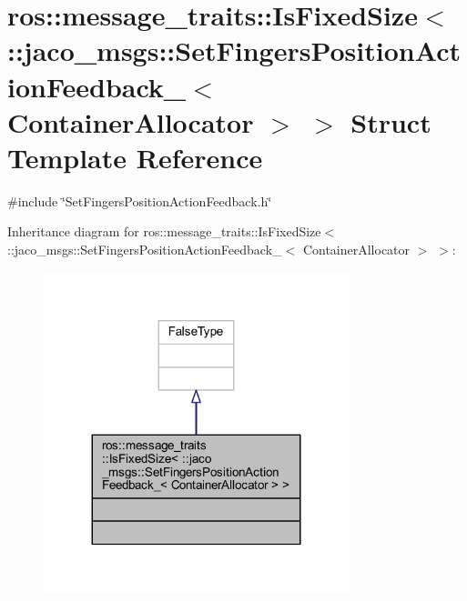 \hypertarget{structros_1_1message__traits_1_1IsFixedSize_3_01_1_1jaco__msgs_1_1SetFingersPositionActionFeedbab6306128ff49827b742b8b843075b28f}{}\section{ros\+:\+:message\+\_\+traits\+:\+:Is\+Fixed\+Size$<$ \+:\+:jaco\+\_\+msgs\+:\+:Set\+Fingers\+Position\+Action\+Feedback\+\_\+$<$ Container\+Allocator $>$ $>$ Struct Template Reference}
\label{structros_1_1message__traits_1_1IsFixedSize_3_01_1_1jaco__msgs_1_1SetFingersPositionActionFeedbab6306128ff49827b742b8b843075b28f}


{\ttfamily \#include \char`\"{}Set\+Fingers\+Position\+Action\+Feedback.\+h\char`\"{}}



Inheritance diagram for ros\+:\+:message\+\_\+traits\+:\+:Is\+Fixed\+Size$<$ \+:\+:jaco\+\_\+msgs\+:\+:Set\+Fingers\+Position\+Action\+Feedback\+\_\+$<$ Container\+Allocator $>$ $>$\+:
\nopagebreak
\begin{figure}[H]
\begin{center}
\leavevmode
\includegraphics[width=251pt]{d4/d3e/structros_1_1message__traits_1_1IsFixedSize_3_01_1_1jaco__msgs_1_1SetFingersPositionActionFeedbaf244110516995a7e86d697cd46927a64}
\end{center}
\end{figure}


